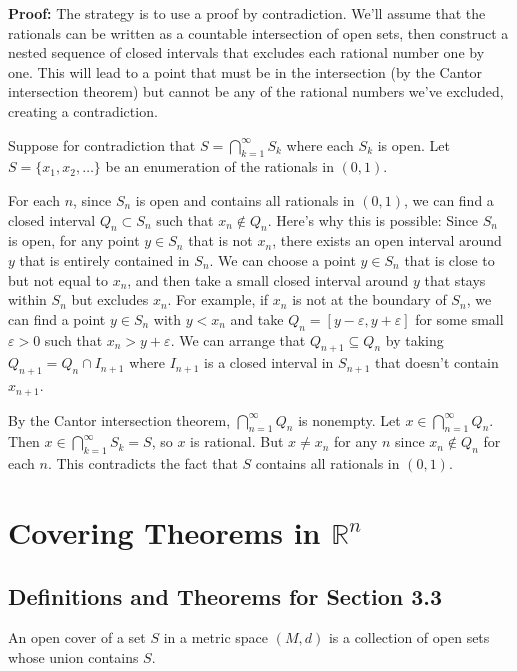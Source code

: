 \textbf{Proof:} The strategy is to use a proof by contradiction. We'll assume that the rationals can be written as a countable intersection of open sets, then construct a nested sequence of closed intervals that excludes each rational number one by one. This will lead to a point that must be in the intersection (by the Cantor intersection theorem) but cannot be any of the rational numbers we've excluded, creating a contradiction.

Suppose for contradiction that $S = \bigcap_{k=1}^{\infty} S_k$ where each $S_k$ is open. Let $S = \{x_1, x_2, \ldots\}$ be an enumeration of the rationals in $(0,1)$.

For each $n$, since $S_n$ is open and contains all rationals in $(0,1)$, we can find a closed interval $Q_n \subset S_n$ such that $x_n \notin Q_n$. Here's why this is possible: Since $S_n$ is open, for any point $y \in S_n$ that is not $x_n$, there exists an open interval around $y$ that is entirely contained in $S_n$. We can choose a point $y \in S_n$ that is close to but not equal to $x_n$, and then take a small closed interval around $y$ that stays within $S_n$ but excludes $x_n$. For example, if $x_n$ is not at the boundary of $S_n$, we can find a point $y \in S_n$ with $y < x_n$ and take $Q_n = [y - \varepsilon, y + \varepsilon]$ for some small $\varepsilon > 0$ such that $x_n > y + \varepsilon$. We can arrange that $Q_{n+1} \subseteq Q_n$ by taking $Q_{n+1} = Q_n \cap I_{n+1}$ where $I_{n+1}$ is a closed interval in $S_{n+1}$ that doesn't contain $x_{n+1}$.

By the Cantor intersection theorem, $\bigcap_{n=1}^{\infty} Q_n$ is nonempty. Let $x \in \bigcap_{n=1}^{\infty} Q_n$. Then $x \in \bigcap_{k=1}^{\infty} S_k = S$, so $x$ is rational. But $x \neq x_n$ for any $n$ since $x_n \notin Q_n$ for each $n$. This contradicts the fact that $S$ contains all rationals in $(0,1)$.

\section{Covering Theorems in $\mathbb{R}^n$}

\subsection*{Definitions and Theorems for Section 3.3}

\begin{definition}
An open cover of a set $S$ in a metric space $(M,d)$ is a collection of open sets whose union contains $S$.
\end{definition}

